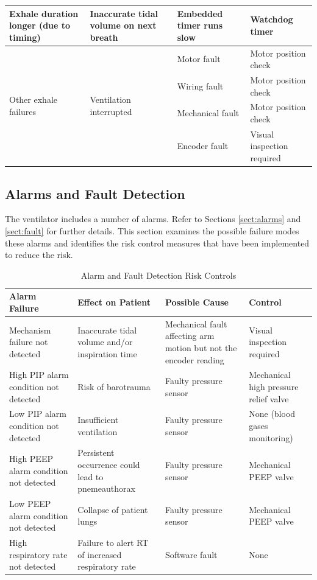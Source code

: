\documentclass[]{article}
\begin{document}
\begin{center}
\begin{table}[h]
\begin{tabular}{ |p{3.5cm}|p{3cm}| p{3.5cm}| p{3.5cm}|}
			Exhale duration longer (due to timing) & Inaccurate tidal volume on next breath &Embedded timer runs slow & Watchdog timer \\ \hline
			\multirow{4}{3.5cm}{Other exhale failures} & \multirow{4}{3cm}{Ventilation interrupted} & Motor fault & Motor position check\\ \cline{3-4}
			& & Wiring fault & Motor position check\\ \cline{3-4}
			& & Mechanical fault & Motor position check\\ \cline{3-4}
			& & Encoder fault & Visual inspection required\\ \hline
			
		\end{tabular}
	\end{table}	
\end{center}

\subsection{Alarms and Fault Detection}
The ventilator includes a number of alarms. Refer to Sections \ref{sect:alarms} and \ref{sect:fault} for further details. This section examines the possible failure modes these alarms and identifies the risk control measures that have been implemented to reduce the risk.

\begin{center}
	\begin{table}[h]
		\caption{Alarm and Fault Detection Risk Controls}
		\label{tab:alarm_risk}
		\begin{tabular}{ |p{3.5cm}|p{3cm}| p{3.5cm}| p{3.5cm}|}
			
			
			\hline
			\textbf{Alarm Failure}& \textbf{Effect on Patient} &\textbf{Possible Cause} & \textbf{Control}  \\ \hline
			Mechanism failure not detected & Inaccurate tidal volume and/or inspiration time& Mechanical fault affecting arm motion but not the encoder reading & Visual inspection required\\ \hline
			High PIP alarm condition not detected & Risk of barotrauma & Faulty pressure sensor & Mechanical high pressure relief valve\\ \hline
			Low PIP alarm condition not detected & Insufficient ventilation & Faulty pressure sensor & None (blood gases monitoring)\\ \hline
			High PEEP alarm condition not detected& Persistent occurrence could lead to pnemeauthorax & Faulty pressure sensor & Mechanical PEEP valve\\ \hline
			Low PEEP alarm condition not detected & Collapse of patient lungs & Faulty pressure sensor & Mechanical PEEP valve\\ \hline
			High respiratory rate not detected & Failure to alert RT of increased respiratory rate & Software fault & None\\ \hline
		
			
		\end{tabular}
	\end{table}	
\end{center}
\end{document}
